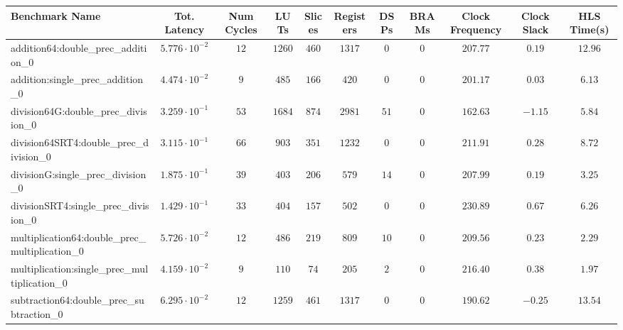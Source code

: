 \begin{tabular}{|l|c|c|c|c|c|c|c|c|c|c|}
\hline
Benchmark Name                                   & Tot. Latency            & Num Cycles & LUTs     & Slices   & Registers & DSPs   & BRAMs & Clock Frequency & Clock Slack & HLS Time(s) \\
\hline
addition64:double\_prec\_addition\_0             & $ 5.776 \cdot 10^{-2} $ & $ 12     $ & $ 1260 $ & $ 460  $ & $ 1317  $ & $ 0  $ & $ 0 $ & $ 207.77      $ & $ 0.19    $ & $ 12.96   $ \\
addition:single\_prec\_addition\_0               & $ 4.474 \cdot 10^{-2} $ & $ 9      $ & $ 485  $ & $ 166  $ & $ 420   $ & $ 0  $ & $ 0 $ & $ 201.17      $ & $ 0.03    $ & $ 6.13    $ \\
division64G:double\_prec\_division\_0            & $ 3.259 \cdot 10^{-1} $ & $ 53     $ & $ 1684 $ & $ 874  $ & $ 2981  $ & $ 51 $ & $ 0 $ & $ 162.63      $ & $ -1.15   $ & $ 5.84    $ \\
division64SRT4:double\_prec\_division\_0         & $ 3.115 \cdot 10^{-1} $ & $ 66     $ & $ 903  $ & $ 351  $ & $ 1232  $ & $ 0  $ & $ 0 $ & $ 211.91      $ & $ 0.28    $ & $ 8.72    $ \\
divisionG:single\_prec\_division\_0              & $ 1.875 \cdot 10^{-1} $ & $ 39     $ & $ 403  $ & $ 206  $ & $ 579   $ & $ 14 $ & $ 0 $ & $ 207.99      $ & $ 0.19    $ & $ 3.25    $ \\
divisionSRT4:single\_prec\_division\_0           & $ 1.429 \cdot 10^{-1} $ & $ 33     $ & $ 404  $ & $ 157  $ & $ 502   $ & $ 0  $ & $ 0 $ & $ 230.89      $ & $ 0.67    $ & $ 6.26    $ \\
multiplication64:double\_prec\_multiplication\_0 & $ 5.726 \cdot 10^{-2} $ & $ 12     $ & $ 486  $ & $ 219  $ & $ 809   $ & $ 10 $ & $ 0 $ & $ 209.56      $ & $ 0.23    $ & $ 2.29    $ \\
multiplication:single\_prec\_multiplication\_0   & $ 4.159 \cdot 10^{-2} $ & $ 9      $ & $ 110  $ & $ 74   $ & $ 205   $ & $ 2  $ & $ 0 $ & $ 216.40      $ & $ 0.38    $ & $ 1.97    $ \\
subtraction64:double\_prec\_subtraction\_0       & $ 6.295 \cdot 10^{-2} $ & $ 12     $ & $ 1259 $ & $ 461  $ & $ 1317  $ & $ 0  $ & $ 0 $ & $ 190.62      $ & $ -0.25   $ & $ 13.54   $ \\

\end{tabular}
